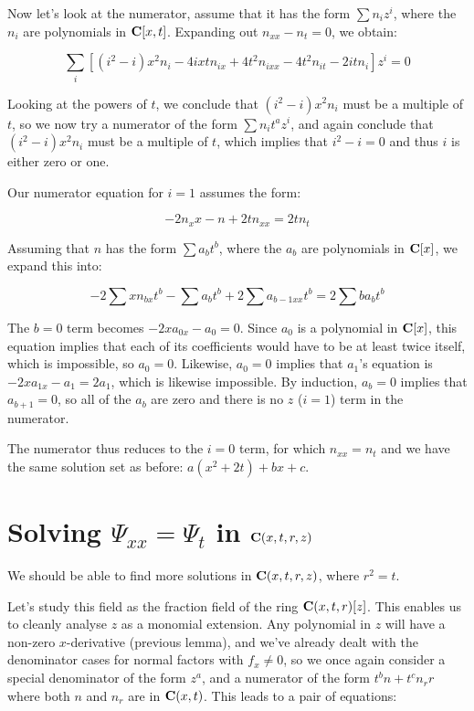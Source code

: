 \documentclass{article}
\newcommand{\C}{\ensuremath{{\bf C}}}
\begin{document}
Now let's look at the numerator, assume that it has the form $\sum n_i z^i$, where the $n_i$
are polynomials in $\C[x,t]$.  Expanding out $n_{xx} - n_t = 0$, we obtain:

$$\sum_i \left[ (i^{2} -i)x^{2}n_i -4ixtn_{ix} +4t^{2}n_{ixx} -4t^{2}n_{it} -2itn_i \right] z^i = 0$$

Looking at the powers of $t$, we conclude that $(i^{2} -i)x^{2}n_i$ must be a multiple
of $t$, so we now try a numerator of the form $\sum n_i t^a z^i$, and again
conclude that $(i^2-i) x^2 n_i$ must be a multiple of $t$, which implies that $i^2-i=0$
and thus $i$ is either zero or one.

Our numerator equation for $i=1$ assumes the form:

$$-2n_x x - n + 2 t n_{xx} = 2 t n_t$$

Assuming that $n$ has the form $\sum a_b t^b$, where the $a_b$ are polynomials in
$\C[x]$, we expand this into:

$$-2\sum x n_{bx} t^b - \sum a_b t^b + 2 \sum a_{b-1xx} t^{b} = 2 \sum b a_b t^b$$

The $b=0$ term becomes $-2xa_{0x} - a_0 = 0$.  Since $a_0$ is a polynomial
in $\C[x]$, this equation implies that each of its coefficients would have
to be at least twice itself, which is impossible, so $a_0=0$.  Likewise,
$a_0=0$ implies that $a_1$'s equation is $-2xa_{1x}-a_1=2a_1$, which is
likewise impossible.  By induction, $a_b=0$ implies that $a_{b+1}=0$,
so all of the $a_b$ are zero and there is no $z$ ($i=1$) term in
the numerator.

The numerator thus reduces to the $i=0$ term, for which $n_{xx}=n_t$
and we have the same solution set as before: $a(x^2+2t)+bx+c$.

\vfill\eject
\section*{Solving $\Psi_{xx}=\Psi_t$ in $\C(x,t,r,z)$}

We should be able to find more solutions in $\C(x,t,r,z)$, where $r^2=t$.

Let's study this field as the fraction field of the ring
$\C(x,t,r)[z]$.  This enables us to cleanly analyse $z$ as a monomial
extension.  Any polynomial in $z$ will have a non-zero $x$-derivative
(previous lemma), and we've already dealt with the denominator cases for
normal factors with $f_x \ne 0$, so we once again consider a special
denominator of the form $z^a$, and a numerator of the form $t^b n +
t^c n_r r$ where both $n$ and $n_r$ are in $\C(x,t)$.  This leads
to a pair of equations:
\end{document}
